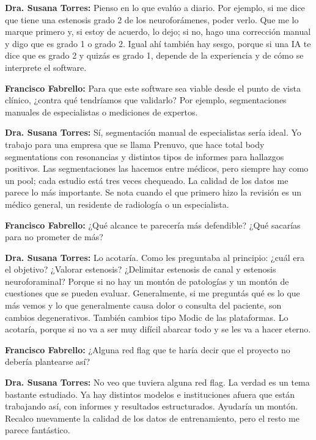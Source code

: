 \noindent\textbf{Dra. Susana Torres:} Pienso en lo que evalúo a diario. Por ejemplo, si me dice que tiene una estenosis grado 2 de los neuroforámenes, poder verlo. Que me lo marque primero y, si estoy de acuerdo, lo dejo; si no, hago una corrección manual y digo que es grado 1 o grado 2. Igual ahí también hay sesgo, porque si una IA te dice que es grado 2 y quizás es grado 1, depende de la experiencia y de cómo se interprete el software.

\noindent\textbf{Francisco Fabrello:} Para que este software sea viable desde el punto de vista clínico, ¿contra qué tendríamos que validarlo? Por ejemplo, segmentaciones manuales de especialistas o mediciones de expertos.

\noindent\textbf{Dra. Susana Torres:} Sí, segmentación manual de especialistas sería ideal. Yo trabajo para una empresa que se llama Prenuvo, que hace total body segmentations con resonancias y distintos tipos de informes para hallazgos positivos. Las segmentaciones las hacemos entre médicos, pero siempre hay como un pool; cada estudio está tres veces chequeado. La calidad de los datos me parece lo más importante. Se nota cuando el que primero hizo la revisión es un médico general, un residente de radiología o un especialista.

\noindent\textbf{Francisco Fabrello:} ¿Qué alcance te parecería más defendible? ¿Qué sacarías para no prometer de más?

\noindent\textbf{Dra. Susana Torres:} Lo acotaría. Como les preguntaba al principio: ¿cuál era el objetivo? ¿Valorar estenosis? ¿Delimitar estenosis de canal y estenosis neuroforaminal? Porque si no hay un montón de patologías y un montón de cuestiones que se pueden evaluar. Generalmente, si me preguntás qué es lo que más vemos y lo que generalmente causa dolor o consulta del paciente, son cambios degenerativos. También cambios tipo Modic de las plataformas. Lo acotaría, porque si no va a ser muy difícil abarcar todo y se les va a hacer eterno.

\noindent\textbf{Francisco Fabrello:} ¿Alguna red flag que te haría decir que el proyecto no debería plantearse así?

\noindent\textbf{Dra. Susana Torres:} No veo que tuviera alguna red flag. La verdad es un tema bastante estudiado. Ya hay distintos modelos e instituciones afuera que están trabajando así, con informes y resultados estructurados. Ayudaría un montón. Recalco nuevamente la calidad de los datos de entrenamiento, pero el resto me parece fantástico.

